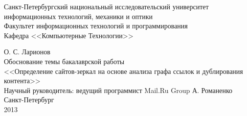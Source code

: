 \documentclass[a4paper, 12pt, titlepage]{article}
\begin{document}
\begin{titlepage}
\begin{center}
Санкт-Петербургский национальный исследовательский университет\\
информационных технологий, механики и оптики\\
Факультет информационных технологий и программирования\\
Кафедра <<Компьютерные Технологии>>

\vspace{10em}
\large О. С. Ларионов\\
\vspace{3em}
\Large Обоснование темы бакалаврской работы\\
<<Определение сайтов-зеркал на основе анализа графа ссылок и дублирования контента>>\\
\vspace{3em}
\large Научный руководитель: ведущий программист Mail.Ru Group А. Романенко\\

\vfill
\normalsize Санкт-Петербург\\
2013
\end{center}
\end{titlepage}
\pagestyle{plain}






\end{document}
